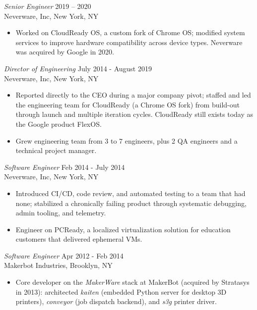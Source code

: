 \documentclass{res} %
\begin{document}
\begin{resume}
{\sl Senior Engineer} \hfill 2019 -- 2020 \\
Neverware, Inc, New York, NY
\begin{itemize}
\item[-] Worked on CloudReady OS, a custom fork of Chrome OS; modified system services to improve hardware compatibility across device types. Neverware was acquired by Google in 2020.
\end{itemize}

{\sl Director of Engineering} \hfill July 2014 - August 2019 \\
Neverware, Inc, New York, NY
\begin{itemize}
\item[-] Reported directly to the CEO during a major company pivot; staffed and led the engineering team for CloudReady (a Chrome OS fork) from build-out through launch and multiple iteration cycles. CloudReady still exists today as the Google product FlexOS.
\item[-] Grew engineering team from 3 to 7 engineers, plus 2 QA engineers and a technical project manager.
\end{itemize}

{\sl Software Engineer} \hfill Feb 2014 - July 2014 \\
Neverware, Inc, New York, NY
\begin{itemize}
\item[-] Introduced CI/CD, code review, and automated testing to a team that had none; stabilized a chronically failing product through systematic debugging, admin tooling, and telemetry.
\item[-] Engineer on PCReady, a localized virtualization solution for education customers that delivered ephemeral VMs.
\end{itemize}

{\sl Software Engineer} \hfill Apr 2012 - Feb 2014 \\
Makerbot Industries, Brooklyn, NY
\begin{itemize}
\item[-] Core developer on the \textit{MakerWare} stack at MakerBot (acquired by Stratasys in 2013): architected \textit{kaiten} (embedded Python server for desktop 3D printers), \textit{conveyor} (job dispatch backend), and \textit{s3g} printer driver.
\end{itemize}


\end{resume}
\end{document}
